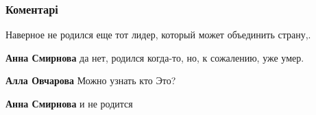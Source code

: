  
 
 
 
 
\subsubsection{Коментарі}
\label{sec:25_08_2021.fb.molchanov_jurij.1.razdelenie_strana.cmt}

\begin{itemize}
 
Наверное не родился еще тот лидер, который может объединить страну,.

\begin{itemize}
 
\textbf{Анна Смирнова} да нет, родился когда-то, но, к сожалению, уже умер.

 
\textbf{Алла Овчарова} Можно узнать кто Это?

 
\textbf{Анна Смирнова} и не родится
\end{itemize}

 

\end{itemize}
